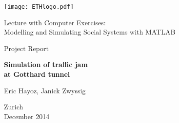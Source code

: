 
\thispagestyle{empty}

\begin{center}
\texttt{[image: ETHlogo.pdf]}

\bigskip


\bigskip


\bigskip


\LARGE{ 	Lecture with Computer Exercises:\\ }
\LARGE{ Modelling and Simulating Social Systems with MATLAB\\}

\bigskip

\bigskip

\small{Project Report}\\

\bigskip

\bigskip

\bigskip

\bigskip

\bigskip

\begin{center}
\textbf{\huge{Simulation of traffic jam}}\\ \vspace{.2cm}
\textbf{\huge{at Gotthard tunnel}}\\
\end{center}
\bigskip

\bigskip

\vspace{1cm}

\Large{Eric Hayoz, Janick Zwyssig}



\bigskip

\bigskip

\bigskip

\bigskip

\bigskip

\bigskip

\bigskip
\vspace{3cm}

Zurich\\
December 2014\\

\end{center}


